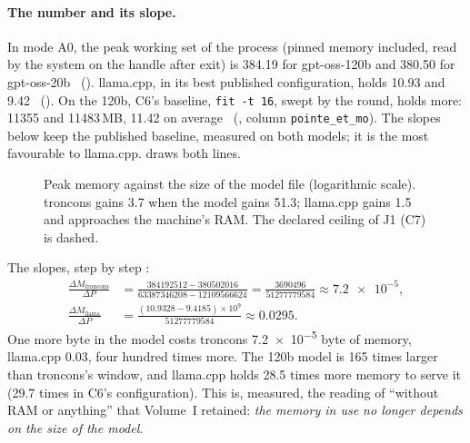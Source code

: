 \paragraph{The number and its slope.} In mode A0, the peak working set of the process (pinned memory included, read by the system on the handle after exit) is \SI{384.19}{\Mo} for gpt-oss-120b and \SI{380.50}{\Mo} for gpt-oss-20b \mes~(). llama.cpp, in its best published configuration, holds \SI{10.93}{\Go} and \SI{9.42}{\Go} \mes~(). On the 120b, C6's baseline, \texttt{fit -t 16}, swept by the round, holds more: \num{11355} and \num{11483}\,MB, \SI{11.42}{\Go} on average \mes~(, column \texttt{pointe\_et\_mo}). The slopes below keep the published baseline, measured on both models; it is the most favourable to llama.cpp.  draws both lines.

\begin{figure}[ht]
\centering
\GrapheResMemoire
\caption[Peak memory against model size]{Peak memory against the size of the model file (logarithmic scale). troncons gains \SI{3.7}{\Mo} when the model gains \SI{51.3}{\Go}; llama.cpp gains \SI{1.5}{\Go} and approaches the machine's RAM. The declared ceiling of J1 (C7) is dashed.}
\label{t2res-fig:memoire}
\end{figure}

The slopes, step by step \calc:
\begin{align*}
\frac{\Delta M_{\text{troncons}}}{\Delta P} &= \frac{\num{384192512} - \num{380502016}}{\num{63387346208} - \num{12109566624}} = \frac{\num{3690496}}{\num{51277779584}} \approx \num{7.2e-5},\\[2pt]
\frac{\Delta M_{\text{llama}}}{\Delta P} &= \frac{(\num{10.9328} - \num{9.4185}) \times 10^{9}}{\num{51277779584}} \approx \num{0.0295}.
\end{align*}
One more byte in the model costs troncons \num{7.2e-5} byte of memory, llama.cpp \num{0.03}, four hundred times more. The 120b model is \num{165} times larger than troncons's window, and llama.cpp holds \num{28.5} times more memory to serve it (\num{29.7} times in C6's configuration). This is, measured, the reading of ``without RAM or anything'' that Volume~I retained: \emph{the memory in use no longer depends on the size of the model}.

